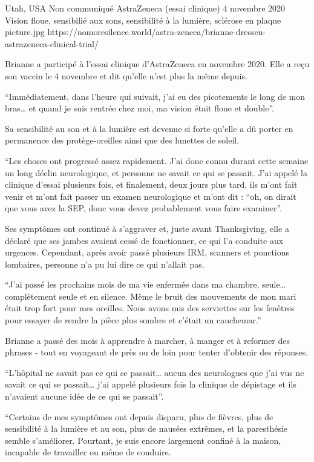 {Utah, USA}
{Non communiqué}
{AstraZeneca (essai clinique)}
{4 novembre 2020}
{Vision floue, sensibilié aux sons, sensibilité à la lumière, sclérose en plaque}
{picture.jpg}
{https://nomoresilence.world/astra-zeneca/brianne-dressen-astrazeneca-clinical-trial/}
{

Brianne a participé à l'essai clinique d'AstraZeneca en novembre 2020. Elle a
reçu son vaccin le 4 novembre et dit qu'elle n'est plus la même depuis.

“Immédiatement, dans l'heure qui suivait, j'ai eu des picotements le long de mon
bras… et quand je suis rentrée chez moi, ma vision était floue et double”.

Sa sensibilité au son et à la lumière est devenue si forte qu'elle a dû porter
en permanence des protège-oreilles ainsi que des lunettes de soleil.

“Les choses ont progressé assez rapidement. J'ai donc connu durant cette semaine
un long déclin neurologique, et personne ne savait ce qui se passait. J'ai
appelé la clinique d'essai plusieurs fois, et finalement, deux jours plus tard,
ils m'ont fait venir et m'ont fait passer un examen neurologique et m'ont dit :
“oh, on dirait que vous avez la SEP, donc vous devez probablement vous faire
examiner”.

Ses symptômes ont continué à s'aggraver et, juste avant Thanksgiving, elle a
déclaré que ses jambes avaient cessé de fonctionner, ce qui l'a conduite aux
urgences. Cependant, après avoir passé plusieurs IRM, scanners et ponctions
lombaires, personne n'a pu lui dire ce qui n'allait pas.

“J'ai passé les prochains mois de ma vie enfermée dans ma chambre, seule…
complètement seule et en silence. Même le bruit des mouvements de mon mari était
trop fort pour mes oreilles. Nous avons mis des serviettes sur les fenêtres pour
essayer de rendre la pièce plus sombre et c'était un cauchemar.”

Brianne a passé des mois à apprendre à marcher, à manger et à reformer des
phrases - tout en voyageant de près ou de loin pour tenter d'obtenir des
réponses.

“L'hôpital ne savait pas ce qui se passait… aucun des neurologues que j'ai vus
ne savait ce qui se passait… j'ai appelé plusieurs fois la clinique de dépistage
et ils n'avaient aucune idée de ce qui se passait”.

“Certains de mes symptômes ont depuis disparu, plus de fièvres, plus de
sensibilité à la lumière et au son, plus de nausées extrêmes, et la paresthésie
semble s'améliorer. Pourtant, je suis encore largement confiné à la maison,
incapable de travailler ou même de conduire.

}
